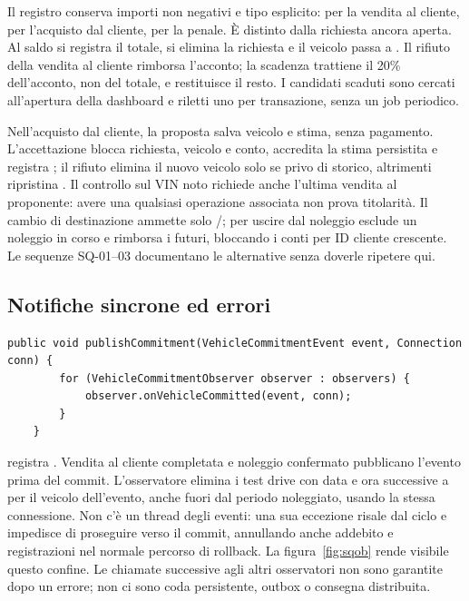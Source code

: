 Il registro  conserva importi non negativi e tipo esplicito:
 per la vendita al cliente,  per l'acquisto dal
cliente,  per la penale. È distinto dalla richiesta ancora
aperta. Al saldo si registra il totale, si elimina la richiesta e il
veicolo passa a . Il rifiuto della vendita al cliente rimborsa
l'acconto; la scadenza trattiene il 20\% dell'acconto, non del totale,
e restituisce il resto. I candidati scaduti sono cercati all'apertura
della dashboard e riletti uno per transazione, senza un job periodico.

Nell'acquisto dal cliente, la proposta salva veicolo  e
stima, senza pagamento. L'accettazione blocca richiesta, veicolo e conto,
accredita la stima persistita e registra ; il rifiuto
elimina il nuovo veicolo solo se privo di storico, altrimenti ripristina
. Il controllo sul VIN noto richiede anche l'ultima vendita al
proponente: avere una qualsiasi operazione associata non prova titolarità.
Il cambio di destinazione ammette solo /; per
uscire dal noleggio esclude un noleggio in corso e rimborsa i futuri,
bloccando i conti per ID cliente crescente. Le sequenze
SQ-01--03 documentano le alternative senza doverle ripetere qui.

\subsection{Notifiche sincrone ed errori}
\noindent\begin{minipage}{\linewidth}
\begin{lstlisting}[firstnumber=28,caption={\code{VehicleEventPublisher.java}: gli osservatori ricevono la connessione del chiamante.},
  label=lst:observer]
    public void publishCommitment(VehicleCommitmentEvent event, Connection conn) {
        for (VehicleCommitmentObserver observer : observers) {
            observer.onVehicleCommitted(event, conn);
        }
    }
\end{lstlisting}
\end{minipage}


 registra .
Vendita al cliente completata e noleggio confermato pubblicano l'evento
prima del commit. L'osservatore elimina i test drive con data e ora
successive a  per il veicolo dell'evento, anche
fuori dal periodo noleggiato, usando la
stessa connessione. Non c'è un thread degli eventi: una sua eccezione
risale dal ciclo e impedisce di proseguire verso il commit, annullando
anche addebito e registrazioni nel normale percorso di rollback.
La figura~\ref{fig:sqob} rende visibile questo confine.
Le chiamate successive agli altri osservatori non sono garantite dopo
un errore; non ci sono coda persistente, outbox o consegna distribuita.

